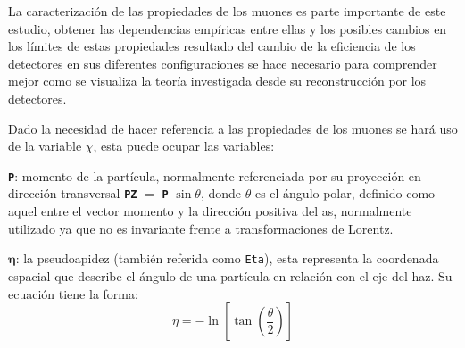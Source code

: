 La caracterización de las propiedades de los muones es parte importante de este estudio, obtener las dependencias empíricas entre ellas y los posibles cambios en los límites de estas propiedades resultado del cambio de la eficiencia de los detectores en sus diferentes configuraciones se hace necesario para comprender mejor como se visualiza la teoría investigada desde su reconstrucción por los detectores.

Dado la necesidad de hacer referencia a las propiedades de los muones se hará uso de la variable $\chi$, esta puede ocupar las variables: 

\begin{itemize_f}
\item[-] \texttt{\textbf{P}}: momento de la partícula, normalmente referenciada por su proyección en dirección transversal \texttt{\textbf{PZ}} $=$ \texttt{\textbf{P}} $\sin \theta$, donde $\theta$ es el ángulo polar, definido como aquel entre el vector momento y la dirección positiva del as, normalmente utilizado ya que no es invariante frente a transformaciones de Lorentz.\\
\item[-] $\mathbf{\eta}$: la pseudoapidez (también referida como \texttt{Eta}), esta representa la coordenada espacial que describe el ángulo de una partícula en relación con el eje del haz. Su ecuación tiene la forma:
\begin{equation}
\eta = -\ln \left[ \tan \left( \dfrac{\theta}{2} \right)\right]
\end{equation}


\end{itemize_f}
